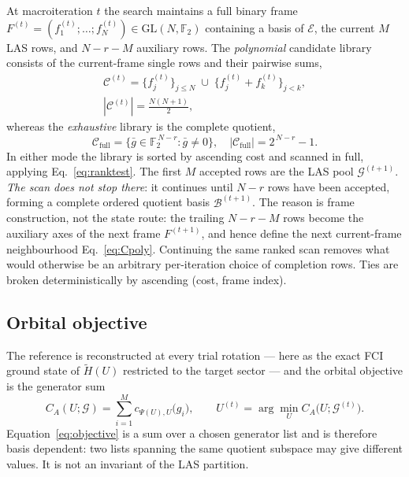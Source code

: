 \documentclass[11pt]{article}
\newcommand{\Ht}{\widetilde H}
\newcommand{\FF}{\mathbb F_2}
\newcommand{\Ecal}{\mathcal E}
\newcommand{\Ccal}{\mathcal C}
\newcommand{\Gcal}{\mathcal G}
\newcommand{\Bcal}{\mathcal B}
\begin{document}
At macroiteration $t$ the search maintains a full binary frame
$F^{(t)}=(f^{(t)}_1;\dots;f^{(t)}_N)\in\mathrm{GL}(N,\FF)$ containing a basis of
$\Ecal$, the current $M$ LAS rows, and $N-r-M$ auxiliary rows. The
\emph{polynomial} candidate library consists of the current-frame single rows
and their pairwise sums,
\begin{equation}
\begin{gathered}
\Ccal^{(t)}=\{f^{(t)}_j\}_{j\le N}\;\cup\;\{f^{(t)}_j+f^{(t)}_k\}_{j<k},\\[2pt]
|\Ccal^{(t)}|=\tfrac{N(N+1)}{2},
\end{gathered}
\label{eq:Cpoly}
\end{equation}
whereas the \emph{exhaustive} library is the complete quotient,
\begin{equation}
\Ccal_{\mathrm{full}}=\{\bar g\in\FF^{\,N-r}:\bar g\neq0\},
\quad |\Ccal_{\mathrm{full}}|=2^{\,N-r}-1 .
\label{eq:Cfull}
\end{equation}
In either mode the library is sorted by ascending cost and scanned in full,
applying Eq.~\eqref{eq:ranktest}. The first $M$ accepted rows are the LAS pool
$\Gcal^{(t+1)}$. \emph{The scan does not stop there}: it continues until
$N-r$ rows have been accepted, forming a complete ordered quotient basis
$\Bcal^{(t+1)}$. The reason is frame construction, not the state route: the
trailing $N-r-M$ rows become the auxiliary axes of the next frame
$F^{(t+1)}$, and hence define the next current-frame neighbourhood
Eq.~\eqref{eq:Cpoly}. Continuing the same ranked scan removes what would
otherwise be an arbitrary per-iteration choice of completion rows. Ties are
broken deterministically by ascending (cost, frame index).

\subsection{Orbital objective}

The reference is reconstructed at every trial rotation --- here as the exact
FCI ground state of $\Ht(U)$ restricted to the target sector --- and the
orbital objective is the generator sum
\begin{equation}
C_A(U;\Gcal)=\sum_{i=1}^{M}c_{\Psi(U),U}\bigl(g_i\bigr),
\qquad
U^{(t)}=\arg\min_U C_A\bigl(U;\Gcal^{(t)}\bigr).
\label{eq:objective}
\end{equation}
Equation~\eqref{eq:objective} is a sum over a chosen generator list and is
therefore basis dependent: two lists spanning the same quotient subspace may
give different values. It is not an invariant of the LAS partition.
\end{document}
